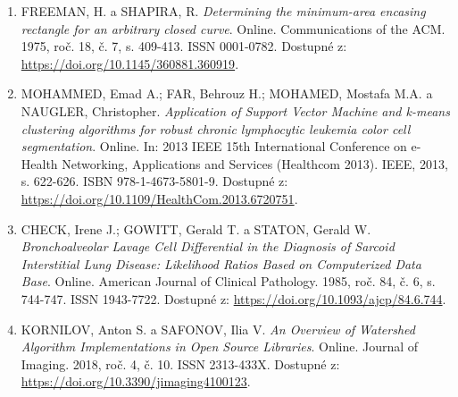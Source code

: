 \documentclass{article}
\begin{document}
\begin{enumerate}
    \item FREEMAN, H. a SHAPIRA, R. \textit{Determining the minimum-area encasing rectangle for an arbitrary closed curve}. Online. Communications of the ACM. 1975, roč. 18, č. 7, s. 409-413. ISSN 0001-0782. Dostupné z: \url{https://doi.org/10.1145/360881.360919}.
    \item MOHAMMED, Emad A.; FAR, Behrouz H.; MOHAMED, Mostafa M.A. a NAUGLER, Christopher. \textit{Application of Support Vector Machine and k-means clustering algorithms for robust chronic lymphocytic leukemia color cell segmentation}. Online. In: 2013 IEEE 15th International Conference on e-Health Networking, Applications and Services (Healthcom 2013). IEEE, 2013, s. 622-626. ISBN 978-1-4673-5801-9. Dostupné z: \url{https://doi.org/10.1109/HealthCom.2013.6720751}.
    \item CHECK, Irene J.; GOWITT, Gerald T. a STATON, Gerald W. \textit{Bronchoalveolar Lavage Cell Differential in the Diagnosis of Sarcoid Interstitial Lung Disease: Likelihood Ratios Based on Computerized Data Base}. Online. American Journal of Clinical Pathology. 1985, roč. 84, č. 6, s. 744-747. ISSN 1943-7722. Dostupné z: \url{https://doi.org/10.1093/ajcp/84.6.744}.
    \item KORNILOV, Anton S. a SAFONOV, Ilia V. \textit{An Overview of Watershed Algorithm Implementations in Open Source Libraries}. Online. Journal of Imaging. 2018, roč. 4, č. 10. ISSN 2313-433X. Dostupné z: \url{https://doi.org/10.3390/jimaging4100123}. 
\end{enumerate}
\end{document}

